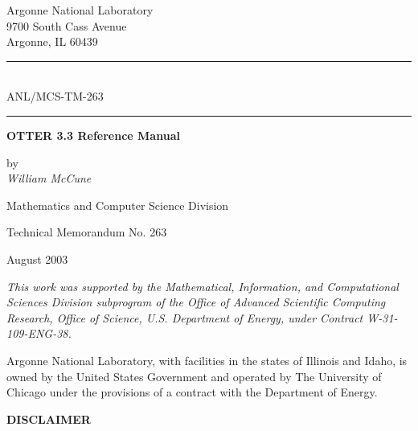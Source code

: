\documentclass[11pt]{article}
\begin{document}
 \sloppy
{}
\setcounter{page}{1}
\thispagestyle{empty}
\begin{center}
Argonne National Laboratory \\
9700 South Cass Avenue\\
Argonne, IL 60439

\vspace{.2in}
\rule{1.5in}{.01in}\\ [1ex]
ANL/MCS-TM-263 \\
\rule{1.5in}{.01in}

\vspace{1in}
{\Large\bf O{\large\bf TTER} 3.3 Reference Manual}

\vspace{.2in}
by \\ [3ex]

{\Large\it William McCune}\\
\thispagestyle{empty}

\vspace{1.5in}
Mathematics and Computer Science Division

\bigskip

Technical Memorandum No. 263

\vspace{1in}
August 2003
\end{center}

\vfill
\noindent
\emph{
This work was supported by the Mathematical, Information, and Computational 
Sciences Division subprogram of the Office of Advanced Scientific Computing 
Research, Office of Science, U.S. Department of Energy, under Contract 
W-31-109-ENG-38.}

\newpage
{}
\setcounter{page}{2}
\noindent
Argonne National Laboratory, with facilities in the states of Illinois
and Idaho, is owned by the United States Government and operated by The
University of Chicago under the provisions of a contract with the
Department of Energy.

\vspace{2in}

\begin{center}
{\bf DISCLAIMER}
\end{center}
\end{document}
